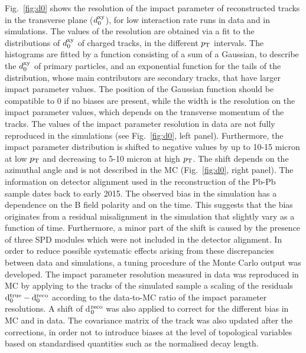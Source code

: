 Fig.~\ref{fig:d0} shows the resolution of the impact parameter of reconstructed tracks 
in the transverse plane ($d_{\rm 0}^{\rm xy}$), for low interaction rate runs in data and in simulations.
The values of the resolution are obtained via a fit to the distributions of $d_{\rm 0}^{\rm xy}$ 
of charged tracks, in the different $p_{\rm T}$ intervals. The histograms are fitted by a function consisting of a sum
of a Gaussian, to describe the $d_{\rm 0}^{\rm xy}$ of primary particles, and an exponential
function for the tails of the distribution, whose main contributors are secondary tracks,
that have larger impact parameter values. The position of the Gaussian function
should be compatible to 0 if no biases are present, while the width is
the resolution on the impact parameter values, which depends on the transverse momentum of the tracks.
The values of the impact parameter resolution in data are not fully reproduced
in the simulations (see Fig.~\ref{fig:d0}, left panel).
Furthermore, the impact parameter distribution is shifted to negative 
values by up to 10-15 micron at low $p_{\rm T}$ and 
decreasing to 5-10 micron at high $p_{\rm T}$. The shift 
depends on the azimuthal angle and is not described 
in the MC (Fig.~\ref{fig:d0}, right panel). 
The information on detector alignment used in the reconstruction of the Pb-Pb sample dates back to early 2015.
The observed bias in the simulation has a dependence on the B field polarity and on the time.
This suggests that the bias originates from a residual misalignment in the simulation
that slightly vary as a function of time. Furthermore, a minor part of the shift is caused
by the presence of three SPD modules which were not included in the detector alignment.
In order to reduce possible systematic effects arising from these discrepancies
between data and simulations, a tuning procedure of the Monte Carlo output
was developed.
 The impact parameter resolution measured in data 
 was reproduced in MC by applying to the tracks of the simulated sample a scaling of 
the residuals ${\rm d}_0^{\rm true}-{\rm d}_0^{\rm reco}$ 
 according to the data-to-MC ratio of the impact parameter 
 resolutions. A shift of d$_0^{\rm reco}$ was also applied to correct for the different bias in MC and in data.
 The covariance matrix of the track was also
 updated after the corrections, in order not to introduce biases at the level
 of topological variables based on standardised quantities such as the normalised decay length. \\
 


